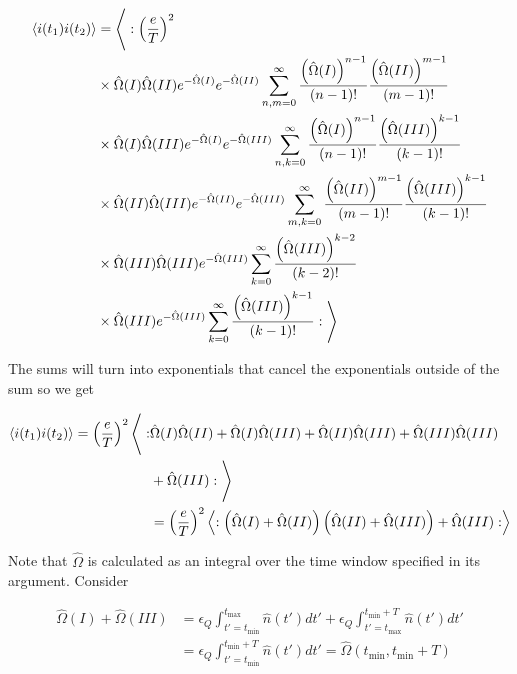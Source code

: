 \documentclass[12pt]{article}
\begin{document}
\begin{align}
\Braket{i(t_1)i(t_2)} &= \Bigg \langle: \left(\frac{e}{T}\right)^2 \\
&\times \hat{\Omega}(I)\hat{\Omega}(II) e^{-\hat{\Omega}(I)}e^{-\hat{\Omega}(II)}\sum_{n,m=0}^{\infty} \frac{\left(\hat{\Omega}(I)\right)^{n-1}}{(n-1)!}\frac{\left(\hat{\Omega}(II)\right)^{m-1}}{(m-1)!}\\
&\times \hat{\Omega}(I)\hat{\Omega}(III) e^{-\hat{\Omega}(I)}e^{-\hat{\Omega}(III)}\sum_{n,k=0}^{\infty} \frac{\left(\hat{\Omega}(I)\right)^{n-1}}{(n-1)!}\frac{\left(\hat{\Omega}(III)\right)^{k-1}}{(k-1)!}\\
&\times \hat{\Omega}(II)\hat{\Omega}(III) e^{-\hat{\Omega}(II)}e^{-\hat{\Omega}(III)}\sum_{m,k=0}^{\infty} \frac{\left(\hat{\Omega}(II)\right)^{m-1}}{(m-1)!}\frac{\left(\hat{\Omega}(III)\right)^{k-1}}{(k-1)!}\\
&\times \hat{\Omega}(III)\hat{\Omega}(III) e^{-\hat{\Omega}(III)}\sum_{k=0}^{\infty} \frac{\left(\hat{\Omega}(III)\right)^{k-2}}{(k-2)!}\\
&\times \hat{\Omega}(III) e^{-\hat{\Omega}(III)}\sum_{k=0}^{\infty} \frac{\left(\hat{\Omega}(III)\right)^{k-1}}{(k-1)!} : \Bigg \rangle
\end{align}

The sums will turn into exponentials that cancel the exponentials outside of the sum so we get

\begin{align}
\Braket{i(t_1)i(t_2)} = \left( \frac{e}{T} \right)^2 \Bigg \langle:&\hat{\Omega}(I)\hat{\Omega}(II)  + \hat{\Omega}(I)\hat{\Omega}(III)  + \hat{\Omega}(II)\hat{\Omega}(III)  + \hat{\Omega}(III)\hat{\Omega}(III)\\
& + \hat{\Omega}(III)  :\Bigg \rangle\\
&= \left(\frac{e}{T} \right)^2 \Braket{:\left(\hat{\Omega}(I)+\hat{\Omega}(II)\right)\left(\hat{\Omega}(II)+\hat{\Omega}(III) \right) + \hat{\Omega}(III):}
\end{align}

Note that $\hat{\Omega}$ is calculated as an integral over the time window specified in its argument. Consider 

\begin{align}
\hat{\Omega}(I) + \hat{\Omega}(III) &= \epsilon_Q\int_{t'=t_{\text{min}}}^{t_{\text{max}}}\hat{n}(t') dt' + \epsilon_Q\int_{t'=t_{\text{max}}}^{t_{\text{min}}+T}\hat{n}(t') dt'\\
&=\epsilon_Q\int_{t'=t_{\text{min}}}^{t_{\text{min}}+T}\hat{n}(t') dt' = \hat{\Omega}(t_{\text{min}},t_{\text{min}}+T)
\end{align}
\end{document}
